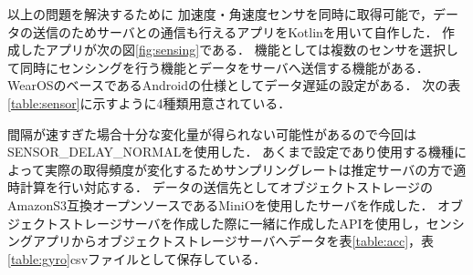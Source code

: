 以上の問題を解決するために
加速度・角速度センサを同時に取得可能で，データの送信のためサーバとの通信も行えるアプリをKotlinを用いて自作した．
作成したアプリが次の図\ref{fig:sensing}である．
機能としては複数のセンサを選択して同時にセンシングを行う機能とデータをサーバへ送信する機能がある．
WearOSのベースであるAndroidの仕様としてデータ遅延の設定がある．
次の表\ref{table:sensor}に示すように4種類用意されている．
\begin{table}[ht]
    \centering
    \caption{センサのデータ遅延設定}
    \label{table:sensor}
\end{table}
間隔が速すぎた場合十分な変化量が得られない可能性があるので今回はSENSOR\_DELAY\_NORMALを使用した．
あくまで設定であり使用する機種によって実際の取得頻度が変化するためサンプリングレートは推定サーバの方で適時計算を行い対応する．
データの送信先としてオブジェクトストレージのAmazonS3互換オープンソースであるMiniOを使用したサーバを作成した．
オブジェクトストレージサーバを作成した際に一緒に作成したAPIを使用し，センシングアプリからオブジェクトストレージサーバへデータを表\ref{table:acc}，表\ref{table:gyro}csvファイルとして保存している．
\begin{table}[ht]
    \centering
    \caption{加速度データの形式}
    \label{table:acc}
\end{table}
